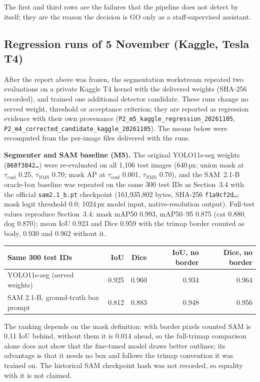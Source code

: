 \documentclass[11pt,a4paper]{article}
\newcommand{\tconf}{$\tau_{\text{conf}}$}
\newcommand{\tnms}{$\tau_{\text{NMS}}$}
\newcommand{\ev}[1]{\nolinkurl{#1}}
\begin{document}
\smallskip
The first and third rows are the failures that the pipeline does not detect by itself; they are the reason the decision is GO only as a staff-supervised assistant.

\subsection{Regression runs of 5 November (Kaggle, Tesla T4)}\label{sec:kaggle}

After the report above was frozen, the segmentation workstream repeated two evaluations on a private Kaggle T4 kernel with the delivered weights (SHA-256 recorded), and trained one additional detector candidate. These runs change no served weight, threshold or acceptance criterion; they are reported as regression evidence with their own provenance (\ev{P2_m5_kaggle_regression_20261105}, \ev{P2_m4_corrected_candidate_kaggle_20261105}). The means below were recomputed from the per-image files delivered with the runs.

\textbf{Segmenter and SAM baseline (M5).} The original YOLO11s-seg weights (\texttt{868f3842\ldots}) were re-evaluated on all 1,106 test images (640\,px; union mask at \tconf{} 0.25, \tnms{} 0.70; mask AP at \tconf{} 0.001, \tnms{} 0.70), and the SAM~2.1-B oracle-box baseline was repeated on the same 300 test IDs as Section~3.4 with the official \texttt{sam2.1\_b.pt} checkpoint (161,935,802 bytes, SHA-256 \texttt{f1a9cf2d\ldots}; mask logit threshold 0.0; 1024\,px model input, native-resolution output). Full-test values reproduce Section~3.4: mask mAP50 0.993, mAP50--95 0.875 (cat 0.880, dog 0.870); mean IoU 0.923 and Dice 0.959 with the trimap border counted as body, 0.930 and 0.962 without it.

\begin{tabularx}{\linewidth}{@{}Y r r r r@{}}
\toprule
Same 300 test IDs & IoU & Dice & IoU, no border & Dice, no border \\
\midrule
YOLO11s-seg (served weights) & 0.925 & 0.960 & 0.934 & 0.964 \\
SAM 2.1-B, ground-truth box prompt & 0.812 & 0.883 & 0.948 & 0.956 \\
\bottomrule
\end{tabularx}

The ranking depends on the mask definition: with border pixels counted SAM is 0.11 IoU behind, without them it is 0.014 ahead, so the full-trimap comparison alone does not show that the fine-tuned model draws better outlines; its advantage is that it needs no box and follows the trimap convention it was trained on. The historical SAM checkpoint hash was not recorded, so equality with it is not claimed.
\end{document}
